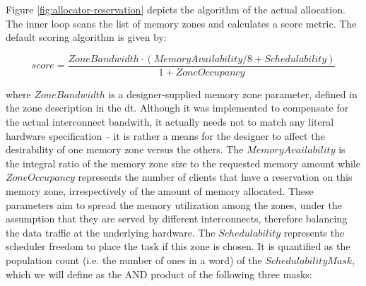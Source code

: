 Figure \ref{fig:allocator-reservation} depicts the algorithm of the actual allocation. 
The inner loop scans the list of memory zones and calculates a score metric.
The default scoring algorithm is given by:

\[
	score = \frac{ZoneBandwidth \cdot \left(MemoryAvailability/8 + Schedulability\right)}{1 + ZoneOccupancy}
\]

where $ZoneBandwidth$ is a designer-supplied memory zone parameter, defined in the zone description in the \gls{dt}.
Although it was implemented to compensate for the actual interconnect bandwith,
it actually needs not to match any literal hardware specification -- it is rather a means for the designer to affect the
desirability of one memory zone versus the others. The $MemoryAvailability$ is the integral ratio of the memory zone size
to the requested memory amount while $ZoneOccupancy$ represents the number of clients that have a reservation on this
memory zone, irrespectively of the amount of memory allocated. These parameters aim to spread the memory utilization 
among the zones, under the assumption that they are served by different interconnects, therefore balancing the data
traffic at the underlying hardware. The $Schedulability$ represents the scheduler freedom to place the task if this zone is chosen.
It is quantified as the population count (i.e. the number of ones in a word) of the $SchedulabilityMask$, which we will define
as the AND product of the following three masks:

